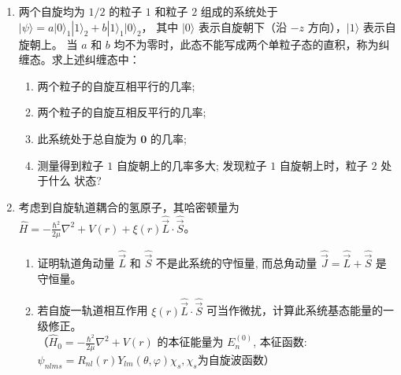\begin{enumerate}
\item 
两个自旋均为 $1/2$ 的粒子 $1$ 和粒子 $2$ 组成的系统处于
$|\psi\rangle=a|0\rangle_1|1\rangle_2+b|1\rangle_1|0\rangle_2$，
其中 $|0\rangle$ 表示自旋朝下（沿 $-z$ 方向），$|1\rangle$ 表示自旋朝上。
当 $a$ 和 $b$ 均不为零时，此态不能写成两个单粒子态的直积，称为纠缠态。求上述纠缠态中：
\begin{enumerate}
	\item
两个粒子的自旋互相平行的几率;
\item
两个粒子的自旋互相反平行的几率;
\item
此系统处于总自旋为 $\mathbf{0}$ 的几率;	
	
\item 
测量得到粒子 $ 1 $ 自旋朝上的几率多大; 发现粒子 $ 1 $ 自旋朝上时，粒子 $ 2 $ 处于什么 状态?


	
	
\end{enumerate}



\item 
考虑到自旋轨道耦合的氢原子，其哈密顿量为 $\hat{H}=-\frac{\hbar^{2}}{2 \mu} \nabla^{2}+V(r)+\xi(r) \hat{\vec{L}} \cdot \hat{\vec{S}}$。
\begin{enumerate}
	\item
	证明轨道角动量 $\hat{\vec{L}}$ 和 $\hat{\vec{S}}$ 不是此系统的守恒量, 而总角动量 $\hat{\vec{J}}=\hat{\vec{L}}+\hat{\vec{S}}$ 是守恒量。
	\item
	若自旋一轨道相互作用 $\xi(r) \hat{\vec{L}} \cdot \hat{\vec{S}}$ 可当作微扰，计算此系统基态能量的一级修正。 \\
	（$\hat{H}_{0}=-\frac{\hbar^{2}}{2 \mu} \nabla^{2}+V(r)$ 的本征能量为 $E_{n}^{(0)}$, 本征函数: $\psi_{n l m s}=R_{n l}(r) Y_{l m}(\theta, \varphi) \chi_{s}, \chi_{s}$为自旋波函数）
	

\end{enumerate}
\end{enumerate}
